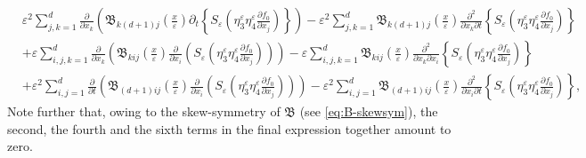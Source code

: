 \documentclass[preprint, 12pt]{amsart}
\numberwithin{equation}{section}
\numberwithin{equation}{section}
\newcommand{\xeps}{\left(\frac{x}{\varepsilon}\right)}
\newcommand{\eps}{\varepsilon}
\begin{document}
\begin{equation*}
\begin{aligned}
& \eps^2 \sum_{j,k=1}^d \frac{\partial}{\partial x_k} \left( \mathfrak{B}_{k(d+1)j}\xeps \partial_t \left\{S_\eps \left( \eta_3^\eps \eta_4^\eps \frac{\partial f_0}{\partial x_j} \right)\right\}\right)
- \eps^2 \sum_{j,k=1}^d \mathfrak{B}_{k(d+1)j}\xeps \frac{\partial^2}{\partial x_k\partial t}\left\{S_\eps \left( \eta_3^\eps \eta_4^\eps \frac{\partial f_0}{\partial x_j} \right)\right\}
\\
& + \eps \sum_{i,j,k=1}^d \frac{\partial}{\partial x_k} \left( \mathfrak{B}_{kij}\xeps \frac{\partial}{\partial x_i} \left( S_\eps \left( \eta_3^\eps \eta_4^\eps \frac{\partial f_0}{\partial x_j} \right)\right)\right)
- \eps \sum_{i,j,k=1}^d \mathfrak{B}_{kij}\xeps \frac{\partial^2}{\partial x_k\partial x_i} \left\{ S_\eps \left( \eta_3^\eps \eta_4^\eps \frac{\partial f_0}{\partial x_j} \right) \right\}
\\
& + \eps^2 \sum_{i,j=1}^d  \frac{\partial}{\partial t} \left( \mathfrak{B}_{(d+1)ij}\xeps \frac{\partial}{\partial x_i} \left( S_\eps \left( \eta_3^\eps \eta_4^\eps \frac{\partial f_0}{\partial x_j} \right)\right)\right)
- \eps^2 \sum_{i,j=1}^d \mathfrak{B}_{(d+1)ij}\xeps \frac{\partial^2}{\partial x_i\partial t} \left\{ S_\eps \left( \eta_3^\eps \eta_4^\eps \frac{\partial f_0}{\partial x_j} \right) \right\},
\end{aligned}
\end{equation*}
Note further that, owing to the skew-symmetry of $\mathfrak{B}$ (see \eqref{eq:B-skewsym}), the second, the fourth and the sixth terms in the final expression together amount to zero. 
\end{document}

